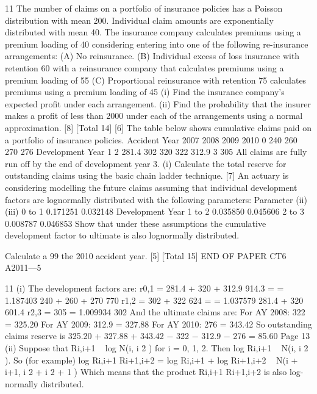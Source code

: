 11
The number of claims on a portfolio of insurance policies has a Poisson distribution
with mean 200. Individual claim amounts are exponentially distributed with mean 40.
The insurance company calculates premiums using a premium loading of 40%
considering entering into one of the following re-insurance arrangements:
(A) No reinsurance.
(B) Individual excess of loss insurance with retention 60 with a reinsurance
company that calculates premiums using a premium loading of 55%
(C) Proportional reinsurance with retention 75%
calculates premiums using a premium loading of 45%
(i) Find the insurance company’s expected profit under each arrangement.
(ii) Find the probability that the insurer makes a profit of less than 2000 under
each of the arrangements using a normal approximation.
[8]
[Total 14]
[6]
The table below shows cumulative claims paid on a portfolio of insurance policies.
Accident Year
2007
2008
2009
2010
0
240
260
270
276
Development Year
1
2
281.4
302
320
322
312.9
3
305
All claims are fully run off by the end of development year 3.
(i)
Calculate the total reserve for outstanding claims using the basic chain ladder
technique.
[7]
An actuary is considering modelling the future claims assuming that individual
development factors are lognormally distributed with the following parameters:
Parameter
\mu 
\sigma
(ii)
(iii)
0 to 1
0.171251
0.032148
Development Year
1 to 2
0.035850
0.045606
2 to 3
0.008787
0.046853
Show that under these assumptions the cumulative development factor to
ultimate is also lognormally distributed.

Calculate a 99%
the 2010 accident year.
[5]
[Total 15]
END OF PAPER
CT6 A2011—5



11
(i)
The development factors are:
r0,1 = 281.4 + 320 + 312.9 914.3
=
= 1.187403
240 + 260 + 270
770
r1,2 = 302 + 322
624
=
= 1.037579
281.4 + 320 601.4
r2,3 = 305
= 1.009934
302
And the ultimate claims are:
For AY 2008: 322  = 325.20
For AY 2009: 312.9   = 327.88
For AY 2010: 276    = 343.42
So outstanding claims reserve is
325.20 + 327.88 + 343.42 − 322 − 312.9 − 276 = 85.60
Page 13%
(ii)
Suppose that Ri,i+1 ~ log N(\mu i, \sigma i 2 ) for i = 0, 1, 2.
Then log Ri,i+1 ~ N(\mu i, \sigma i 2 ).
So (for example)
log Ri,i+1 Ri+1,i+2 = log Ri,i+1 + log Ri+1,i+2 ~ N(\mu i + \mu i+1, \sigma i 2 + \sigma i 2 + 1 )
Which means that the product Ri,i+1 Ri+1,i+2 is also log-normally distributed.

